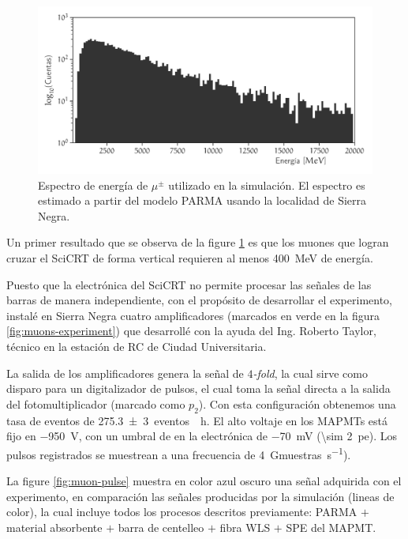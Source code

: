\begin{figure}
        \centering
        \includegraphics[width=\textwidth]{scibar-edep.pdf}
        \caption{Espectro de energía de $\mu^{\pm}$ utilizado en la simulación. El espectro es estimado a partir del modelo PARMA usando la localidad de Sierra Negra.}
        \label{fig:muons-spectrum}
\end{figure}

Un primer resultado que se observa de la figure \ref{fig:muons-spectrum} es que los muones que logran cruzar el SciCRT de forma vertical requieren al menos \SI{400}{\mega\electronvolt} de energía.

Puesto que la electrónica del SciCRT no permite procesar las señales de las barras de manera independiente, con el propósito de desarrollar el experimento, instalé en Sierra Negra cuatro amplificadores (marcados en verde en la figura \ref{fig:muons-experiment}) que desarrollé con la ayuda del Ing. Roberto Taylor, técnico en la estación de RC de Ciudad Universitaria.

La salida de los amplificadores genera la señal de \emph{$4$-fold}, la cual sirve como disparo para un digitalizador de pulsos, el cual toma la señal directa a la salida del fotomultiplicador (marcado como $p_{2}$). Con esta configuración obtenemos una tasa de eventos de \SI{275.3(30)}{eventos \per\hour}. El alto voltaje en los MAPMTs está fijo en \SI{-950}{\volt}, con un umbral de en la electrónica de \SI{-70}{\milli\volt} (\SI{\sim 2}{pe}). Los pulsos registrados se muestrean a una frecuencia de \SI{4}{\giga muestras\per\second}).

La figure \ref{fig:muon-pulse} muestra en color azul oscuro una señal adquirida con el experimento, en comparación las señales producidas por la simulación (lineas de color), la cual incluye todos los procesos descritos previamente: PARMA $+$ material absorbente $+$ barra de centelleo $+$ fibra WLS $+$ SPE del MAPMT.

